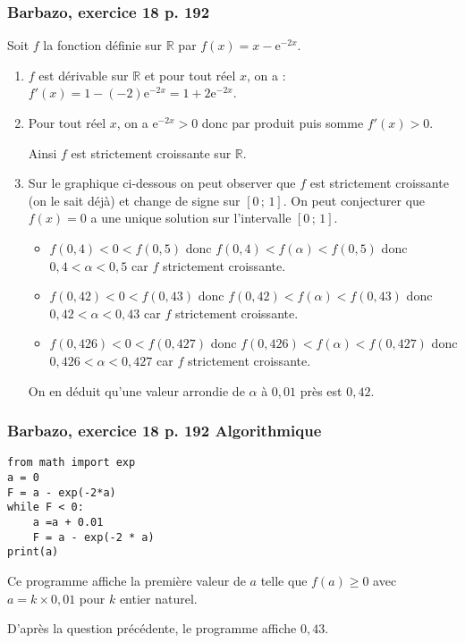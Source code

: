 \documentclass[11pt, hyperref={urlcolor=red,%
            linkcolor=blue, %
            colorlinks=true}]{beamer}
\newcommand{\R}{\mathbb{R}}
\newcommand{\Interff}[2]{\left[#1\, ;\, #2\right]}
\begin{document}
\begin{frame}
\frametitle{Barbazo, exercice 18 p. 192}
\label{exo18}

Soit $f$ la fonction définie sur $\R$ par $f(x)=x-\text{e}^{-2x}$.

\begin{enumerate}
	\item $f$ est dérivable sur $\R$ et pour tout réel $x$, on a :$f'(x)=1-(-2)\text{e}^{-2x}= 1+2\text{e}^{-2x}$.
	\item Pour tout réel $x$, on a $\text{e}^{-2x}>0$ donc par produit puis somme $f'(x)>0$.
	
	Ainsi $f$ est strictement croissante sur $\R$.
	\item Sur le graphique ci-dessous on peut observer que $f$ est strictement croissante (on le sait déjà) et change de signe sur $\Interff{0}{1}$. On peut conjecturer que $f(x)=0$ a une unique solution sur l'intervalle $\Interff{0}{1}$.
	\begin{itemize}
		\item $f(0,4)<0<f(0,5)$ donc $f(0,4)<f(\alpha)<f(0,5)$ donc  $0,4<\alpha<0,5$ car $f$ strictement croissante. 
			\item $f(0,42)<0<f(0,43)$ donc $f(0,42)<f(\alpha)<f(0,43)$ donc  $0,42<\alpha<0,43$ car $f$ strictement croissante. 
						\item $f(0,426)<0<f(0,427)$ donc $f(0,426)<f(\alpha)<f(0,427)$ donc  $0,426<\alpha<0,427$ car $f$ strictement croissante. 
	\end{itemize}
	
On en déduit qu'une valeur arrondie de $\alpha$ à $0,01$ près est $0,42$.
	
\end{enumerate}

\end{frame}

\begin{frame}[fragile]
\frametitle{Barbazo, exercice 18 p. 192 Algorithmique}

\begin{lstlisting}
from math import exp
a = 0
F = a - exp(-2*a)
while F < 0:
	a =a + 0.01
	F = a - exp(-2 * a)
print(a)
\end{lstlisting}

Ce programme affiche la première valeur de $a$ telle que $f(a)\geqslant 0$ avec $a=k \times 0,01$ pour $k$ entier naturel.

D'après la question précédente, le programme affiche $0,43$.

\end{frame}
\end{document}
